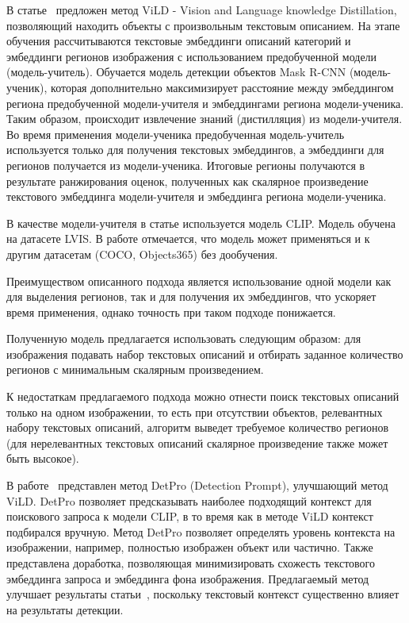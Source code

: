 \documentclass[a4paper,14pt]{article}
\begin{document}
    В статье~\cite{ViLD} предложен метод ViLD - Vision and Language knowledge Distillation, позволяющий находить объекты с произвольным текстовым описанием.
    На этапе обучения рассчитываются текстовые эмбеддинги описаний категорий и эмбеддинги регионов изображения с использованием предобученной модели (модель-учитель).
    Обучается модель детекции объектов Mask R-CNN (модель-ученик), которая дополнительно максимизирует расстояние между эмбеддингом региона предобученной модели-учителя и эмбеддингами региона модели-ученика.
    Таким образом, происходит извлечение знаний (дистилляция) из модели-учителя.
    Во время применения модели-ученика предобученная модель-учитель используется только для получения текстовых эмбеддингов, а эмбеддинги для регионов получается из модели-ученика.
    Итоговые регионы получаются в результате ранжирования оценок, полученных как скалярное произведение текстового эмбеддинга модели-учителя и эмбеддинга региона модели-ученика.

    В качестве модели-учителя в статье используется модель CLIP.
    Модель обучена на датасете LVIS.
    В работе отмечается, что модель может применяться и к другим датасетам (COCO, Objects365) без дообучения.

    Преимуществом описанного подхода является использование одной модели как для выделения регионов, так и для получения их эмбеддингов, что ускоряет время применения, однако точность при таком подходе понижается.

    Полученную модель предлагается использовать следующим образом: для изображения подавать набор текстовых описаний и отбирать заданное количество регионов с минимальным скалярным произведением.

    К недостаткам предлагаемого подхода можно отнести поиск текстовых описаний только на одном изображении, то есть при отсутствии объектов, релевантных набору текстовых описаний, алгоритм выведет требуемое количество регионов (для нерелевантных текстовых описаний скалярное произведение также может быть высокое).
    
    В работе~\cite{detpro} представлен метод DetPro (Detection Prompt), улучшающий метод ViLD. 
    DetPro позволяет предсказывать наиболее подходящий контекст для поискового запроса к модели CLIP, в то время как в методе ViLD контекст подбирался вручную.
    Метод DetPro позволяет определять уровень контекста на изображении, например, полностью изображен объект или частично.
    Также представлена доработка, позволяющая минимизировать схожесть текстового эмбеддинга запроса и эмбеддинга фона изображения.
    Предлагаемый метод улучшает результаты статьи~\cite{ViLD}, поскольку текстовый контекст существенно влияет на результаты детекции.
\end{document}
